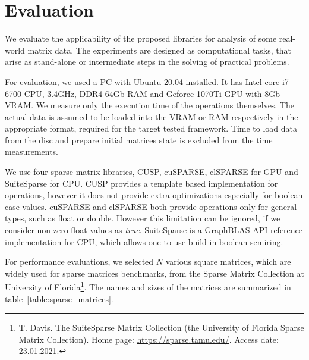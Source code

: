 \section{Evaluation}



We evaluate the applicability of the proposed libraries for analysis of some real-world matrix data.
The experiments are designed as computational tasks, that arise as stand-alone or intermediate steps in the solving of practical problems.

For evaluation, we used a PC with Ubuntu 20.04 installed.
It has Intel core i7-6700 CPU, 3.4GHz, DDR4 64Gb RAM and Geforce 1070Ti GPU with 8Gb VRAM.
We measure only the execution time of the operations themselves.
The actual data is assumed to be loaded into the VRAM or RAM respectively in the appropriate format, required for the target tested framework.
Time to load data from the disc and prepare initial matrices state is excluded from the time measurements.

We use four sparse matrix libraries, CUSP, cuSPARSE, clSPARSE for GPU and SuiteSparse for CPU.
CUSP provides a template based implementation for operations, however it does not provide extra optimizations especially for boolean case values. cuSPARSE and clSPARSE both provide operations only for general types, such as float or double.
However this limitation can be ignored, if we consider non-zero float values as \textit{true}.
SuiteSparse is a GraphBLAS API reference implementation for CPU, which allows one to use build-in boolean semiring.

For performance evaluations, we selected $N$ various square matrices, which are widely used for sparse matrices benchmarks, from the Sparse Matrix Collection at University of Florida\footnote{T. Davis. The SuiteSparse Matrix Collection (the University of Florida Sparse Matrix Collection). Home page: \url{https://sparse.tamu.edu/}. Access date: 23.01.2021.}.
The names and sizes of the matrices are summarized in table~\ref{table:sparse_matrices}.

